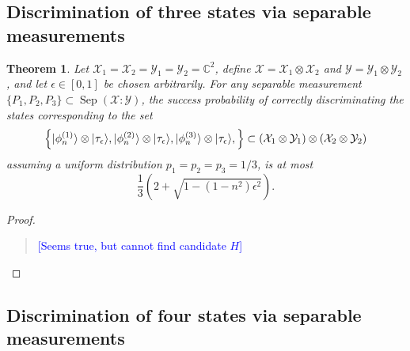 \documentclass[11pt]{article}
\newtheorem{theorem}{Theorem}
\theoremstyle{definition}
\newcommand{\comment}[1]{\begin{quote}\sf 
    \textcolor{blue}{[#1]}\end{quote}}
\newcommand{\microspace}{\mspace{0.5mu}}
\newcommand{\sep}{\operatorname{Sep}}
\newcommand{\ket}[1]{
  \lvert\microspace #1 \microspace \rangle}
\newcommand{\complex}{\mathbb{C}}
\newcommand{\X}{\mathcal{X}}
\newcommand{\Y}{\mathcal{Y}}
\begin{document}
\subsection*{Discrimination of three states via separable measurements}
\label{sec:discrim-three-states-sep-resource}

\begin{theorem}
    Let $\X_1 = \X_2 = \Y_1 = \Y_2 = \complex^2$, define $\X = \X_1 \otimes
    \X_2$ and $\Y = \Y_1 \otimes \Y_2$, and let $\epsilon \in [0,1]$ be chosen
    arbitrarily. For any separable measurement $\{ P_1, P_2, P_3 \}
    \subset \sep(\X : \Y)$, the success probability of correctly discriminating
    the states corresponding to the set 
	\begin{equation}
        \left\{ 
            \ket{\phi_n^{(1)}} \otimes \ket{\tau_{\epsilon}},
            \ket{\phi_n^{(2)}} \otimes \ket{\tau_{\epsilon}},
            \ket{\phi_n^{(3)}} \otimes \ket{\tau_{\epsilon}},
        \right\} \subset 
        \left(\X_1 \otimes \Y_1 \right) \otimes \left(\X_2 \otimes \Y_2 \right)
	\end{equation}
    assuming a uniform distribution $p_1 = p_2 = p_3 = 1/3$, is at most
    \begin{equation}
        \frac{1}{3} \left(2 + \sqrt{1 - (1 - n^2) \epsilon^2} \right).
    \end{equation}
\end{theorem}
\begin{proof}
    \comment{Seems true, but cannot find candidate $H$}
\end{proof}


\subsection*{Discrimination of four states via separable measurements}
\label{sec:discrim-four-states-sep-resource}
\end{document}
